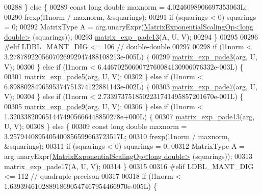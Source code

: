 \begin{DoxyCode}
00288     \} \textcolor{keywordflow}{else} \{
00289       \textcolor{keyword}{const} \textcolor{keywordtype}{long} \textcolor{keywordtype}{double} maxnorm = 4.0246098906697353063L;
00290       frexp(l1norm / maxnorm, &squarings);
00291       \textcolor{keywordflow}{if} (squarings < 0) squarings = 0;
00292       MatrixType A = arg.unaryExpr(\hyperlink{struct_eigen_1_1internal_1_1_matrix_exponential_scaling_op}{MatrixExponentialScalingOp<long double>}
      (squarings));
00293       \hyperlink{namespace_eigen_1_1internal_ae7d0962a143c96343984440db683905a}{matrix\_exp\_pade13}(A, U, V);
00294     \}
00295   
00296 \textcolor{preprocessor}{#elif LDBL\_MANT\_DIG <= 106  // double-double}
00297   
00298     \textcolor{keywordflow}{if} (l1norm < 3.2787892205607026992947488108213e-005L) \{
00299       \hyperlink{namespace_eigen_1_1internal_a7e6cf2e01b6fb376d33b9bb8183e5777}{matrix\_exp\_pade3}(arg, U, V);
00300     \} \textcolor{keywordflow}{else} \textcolor{keywordflow}{if} (l1norm < 6.4467025060072760084130906076332e-003L) \{
00301       \hyperlink{namespace_eigen_1_1internal_af4992d182490219270a24aaa8285e63a}{matrix\_exp\_pade5}(arg, U, V);
00302     \} \textcolor{keywordflow}{else} \textcolor{keywordflow}{if} (l1norm < 6.8988028496595374751374122881143e-002L) \{
00303       \hyperlink{namespace_eigen_1_1internal_a1abecb439e6cb1b5188828cdb7e0ab60}{matrix\_exp\_pade7}(arg, U, V);
00304     \} \textcolor{keywordflow}{else} \textcolor{keywordflow}{if} (l1norm < 2.7339737518502231741495857201670e-001L) \{
00305       \hyperlink{namespace_eigen_1_1internal_a218447e97bf869bf354f92e020a7355a}{matrix\_exp\_pade9}(arg, U, V);
00306     \} \textcolor{keywordflow}{else} \textcolor{keywordflow}{if} (l1norm < 1.3203382096514474905666448850278e+000L) \{
00307       \hyperlink{namespace_eigen_1_1internal_ae7d0962a143c96343984440db683905a}{matrix\_exp\_pade13}(arg, U, V);
00308     \} \textcolor{keywordflow}{else} \{
00309       \textcolor{keyword}{const} \textcolor{keywordtype}{long} \textcolor{keywordtype}{double} maxnorm = 3.2579440895405400856599663723517L;
00310       frexp(l1norm / maxnorm, &squarings);
00311       \textcolor{keywordflow}{if} (squarings < 0) squarings = 0;
00312       MatrixType A = arg.unaryExpr(\hyperlink{struct_eigen_1_1internal_1_1_matrix_exponential_scaling_op}{MatrixExponentialScalingOp<long double>}
      (squarings));
00313       matrix\_exp\_pade17(A, U, V);
00314     \}
00315   
00316 \textcolor{preprocessor}{#elif LDBL\_MANT\_DIG <= 112  // quadruple precison}
00317   
00318     \textcolor{keywordflow}{if} (l1norm < 1.639394610288918690547467954466970e-005L) \{

\end{DoxyCode}
